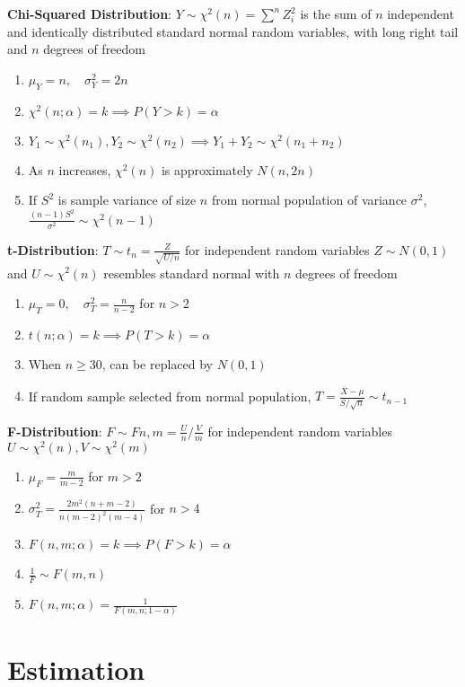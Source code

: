 \documentclass[12pt, a4paper]{article}
\begin{document}
\begin{multicols*}{3}
\textbf{Chi-Squared Distribution}: $Y \sim \chi^2(n) = \sum^n Z_i^2$ is the sum of $n$ independent and identically distributed standard normal random variables, with long right tail and $n$ degrees of freedom
\begin{enumerate}[\roman*.]
  \item $\mu_Y = n,\quad \sigma^2_Y = 2n$
  \item $\chi^2(n;\alpha) = k \implies P(Y>k) = \alpha$
  \item $Y_1 \sim \chi^2(n_1), Y_2 \sim \chi^2(n_2)\implies Y_1+Y_2\sim \chi^2(n_1+n_2)$
  \item As $n$ increases, $\chi^2(n)$ is approximately $N(n, 2n)$
  \item If $S^2$ is sample variance of size $n$ from normal population of variance $\sigma^2$, $\frac{(n-1)S^2}{\sigma^2}\sim\chi^2(n-1)$
\end{enumerate}

\textbf{t-Distribution}: $T \sim t_n = \frac{Z}{\sqrt{U /n}}$ for independent random variables $Z\sim N(0, 1)$ and $U\sim\chi^2(n)$ resembles standard normal with $n$ degrees of freedom 
\begin{enumerate}[\roman*.]
  \item $\mu_T = 0,\quad \sigma^2_T = \frac{n}{n - 2}$ for $n > 2$
  \item $t(n;\alpha) = k \implies P(T>k) = \alpha$
  \item When $n \geq 30$, can be replaced by $N(0, 1)$
  \item If random sample selected from normal population, $T = \frac{\overline{X}-\mu}{S /\sqrt{n}} \sim t_{n-1}$ 
\end{enumerate}

\textbf{F-Distribution}: $F \sim F{n, m} = \frac{U}{n} / \frac{V}{m}$ for independent random variables $U \sim \chi^2(n), V\sim\chi^2(m)$
\begin{enumerate}[\roman*.]
  \item $\mu_F = \frac{m}{m-2}$ for $m > 2$
  \item $\sigma^2_T = \frac{2m^2(n+m-2)}{n(m-2)^2(m-4)}$ for $n>4$
  \item $F(n, m;\alpha) = k \implies P(F> k) = \alpha$
  \item $\frac{1}{F}\sim F(m, n)$
  \item $F(n, m; \alpha) = \frac{1}{F(m, n; 1-\alpha)}$
\end{enumerate}

\colbreak
\section{Estimation}


\end{multicols*}
\end{document}

